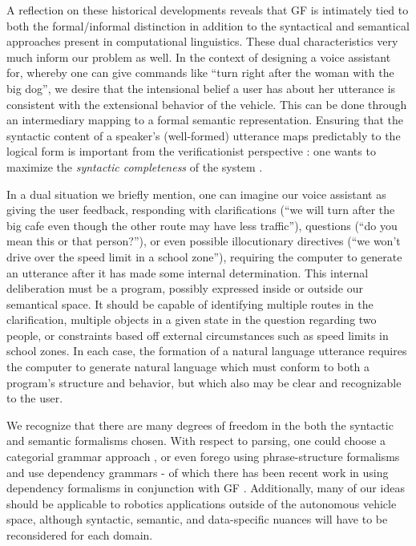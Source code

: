 \documentclass[a4paper, 11pt]{article}
\begin{document}
A reflection on these historical developments reveals that GF is intimately tied
to both the formal/informal distinction in addition to the syntactical and
semantical approaches present in computational linguistics. These dual characteristics
very much inform our problem as well. In the context of designing a voice
assistant for, whereby one can give commands like ``turn
right after the woman with the big dog'', we desire that the intensional belief a
user has about her utterance is consistent with the extensional behavior of the
vehicle. This can be done through an intermediary mapping to a formal semantic
representation. Ensuring that the syntactic content of a speaker's
(well-formed) utterance maps predictably to the logical form is important from
the verificationist perspective : one wants to maximize the \emph{syntactic
completeness} of the system \cite{macmillan2021}.

In a dual situation we briefly mention, one can imagine our voice assistant as
giving the user feedback, responding with clarifications (``we will turn after
the big cafe even though the other route may have less traffic''), questions
(``do you mean this or that person?''), or even possible illocutionary
directives (``we won't drive over the speed limit in a school zone''), requiring
the computer to generate an utterance after it has made some internal
determination. This internal deliberation must be a program, possibly expressed
inside or outside our semantical space. It should be capable of identifying
multiple routes in the clarification, multiple objects in a given state in the
question regarding two people, or constraints based off external circumstances
such as speed limits in school zones. In each case, the formation of a natural
language utterance requires the computer to generate natural language which must
conform to both a program's structure and behavior, but which also may be clear
and recognizable to the user.

We recognize that there are many degrees of freedom in the both the syntactic
and semantic formalisms chosen. With respect to parsing, one could choose a
categorial grammar approach \cite{5152776}, or even forego using
phrase-structure formalisms and use dependency grammars - of which there has
been recent work in using dependency formalisms in conjunction with GF
\cite{ranta2017cross}. Additionally, many of our ideas should be applicable to
robotics applications outside of the autonomous vehicle space, although
syntactic, semantic, and data-specific nuances will have to be reconsidered for
each domain.
\end{document}
